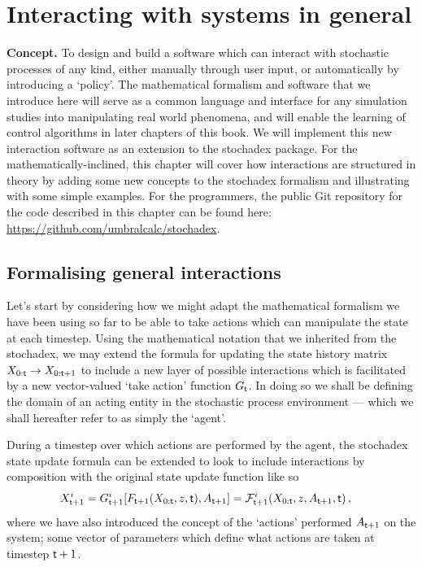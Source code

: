 \chapter{\sffamily Interacting with systems in general}

{\bfseries\sffamily Concept.} To design and build a software which can interact with stochastic processes of any kind, either manually through user input, or automatically by introducing a `policy'. The mathematical formalism and software that we introduce here will serve as a common language and interface for any simulation studies into manipulating real world phenomena, and will enable the learning of control algorithms in later chapters of this book. We will implement this new interaction software as an extension to the stochadex package. For the mathematically-inclined, this chapter will cover how interactions are structured in theory by adding some new concepts to the stochadex formalism and illustrating with some simple examples. For the programmers, the public Git repository for the code described in this chapter can be found here: \href{https://github.com/umbralcalc/stochadex}{https://github.com/umbralcalc/stochadex}.

\section{\sffamily Formalising general interactions}

Let's start by considering how we might adapt the mathematical formalism we have been using so far to be able to take actions which can manipulate the state at each timestep. Using the mathematical notation that we inherited from the stochadex, we may extend the formula for updating the state history matrix $X_{0:{\sf t}}\rightarrow X_{0:{\sf t}+1}$ to include a new layer of possible interactions which is facilitated by a new vector-valued `take action' function $G_{{\sf t}}$. In doing so we shall be defining the domain of an acting entity in the stochastic process environment --- which we shall hereafter refer to as simply the `agent'.

During a timestep over which actions are performed by the agent, the stochadex state update formula can be extended to look to include interactions by composition with the original state update function like so
\begin{align}
X_{{\sf t}+1}^i &= G^i_{{\sf t}+1}[F_{{\sf t}+1}(X_{0:{\sf t}}, z, {\sf t}), A_{{\sf t}+1}] = {\cal F}^i_{{\sf t}+1}(X_{0:{\sf t}}, z, A_{{\sf t}+1}, {\sf t}) \label{eq:generalised-state-actions} \,,
\end{align}
where we have also introduced the concept of the `actions' performed $A_{{\sf t}+1}$ on the system; some vector of parameters which define what actions are taken at timestep ${\sf t}+1$.

